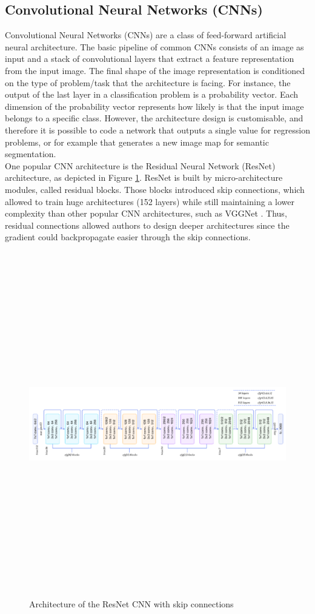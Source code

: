 \documentclass[11pt, a4paper]{article}
\begin{document}
\subsection{Convolutional Neural Networks (CNNs)}
Convolutional Neural Networks (CNNs) are a class of feed-forward artificial neural architecture. The basic pipeline of common CNNs consists of an image as input and a stack of convolutional layers that extract a feature representation from the input image. The final shape of the image representation is conditioned on the type of problem/task that the architecture is facing. For instance, the output of the last layer in a classification problem is a probability vector. Each dimension of the probability vector represents how likely is that the input image belongs to a specific class. However, the architecture design is customisable, and therefore it is possible to code a network that outputs a single value for regression problems, or for example that generates a new image map for semantic segmentation. \\ \newline \noindent One popular CNN architecture is the Residual Neural Network (ResNet) architecture, as depicted in Figure \ref{resnet}. ResNet is built by micro-architecture modules, called residual blocks. Those blocks introduced skip connections, which allowed to train huge architectures (152 layers) while still maintaining a lower complexity than other popular CNN architectures, such as VGGNet \cite{deeplearning}. Thus, residual connections allowed authors to design deeper architectures since the gradient could backpropagate easier through the skip connections.\begin{figure}[H]
    \centering
    \includegraphics[width=15cm,height=15cm,keepaspectratio]{Figures/resnet.png}
    \caption{Architecture of the ResNet CNN with skip connections}
    \label{resnet}
\end{figure}
\end{document}
